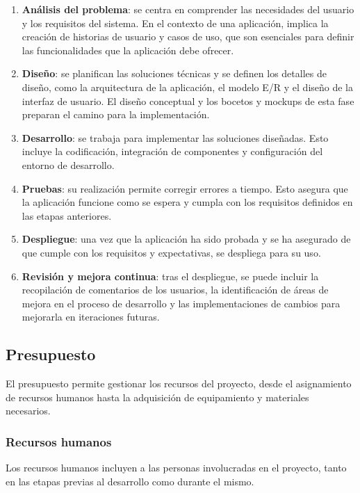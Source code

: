 \begin{enumerate}
    \item \textbf{Análisis del problema}: se centra en comprender las necesidades del usuario y los requisitos del sistema. En el contexto de una aplicación, implica la creación de historias de usuario y casos de uso, que son esenciales para definir las funcionalidades que la aplicación debe ofrecer.
    \item \textbf{Diseño}: se planifican las soluciones técnicas y se definen los detalles de diseño, como la arquitectura de la aplicación, el modelo E/R y el diseño de la interfaz de usuario. El diseño conceptual y los bocetos y mockups de esta fase preparan el camino para la implementación.
    \item \textbf{Desarrollo}: se trabaja para implementar las soluciones diseñadas. Esto incluye la codificación, integración de componentes y configuración del entorno de desarrollo.
    \item \textbf{Pruebas}: su realización permite corregir errores a tiempo. Esto asegura que la aplicación funcione como se espera y cumpla con los requisitos definidos en las etapas anteriores.
    \item \textbf{Despliegue}: una vez que la aplicación ha sido probada y se ha asegurado de que cumple con los requisitos y expectativas, se despliega para su uso.
    \item \textbf{Revisión y mejora continua}: tras el despliegue, se puede incluir la recopilación de comentarios de los usuarios, la identificación de áreas de mejora en el proceso de desarrollo y las implementaciones de cambios para mejorarla en iteraciones futuras.
\end{enumerate}

\newpage

\subsection{Presupuesto}

El presupuesto permite gestionar los recursos del proyecto, desde el asignamiento de recursos humanos hasta la adquisición de equipamiento y materiales necesarios.

\subsubsection{Recursos humanos}
Los recursos humanos incluyen a las personas involucradas en el proyecto, tanto en las etapas previas al desarrollo como durante el mismo.

